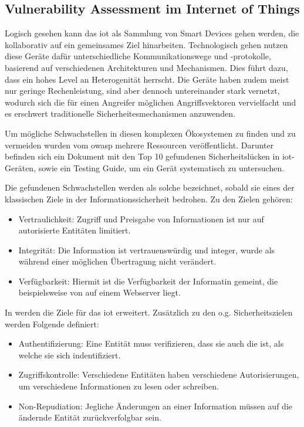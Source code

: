 \subsection{Vulnerability Assessment im Internet of Things}
\label{sec:sota_sa}
    Logisch gesehen kann das \gls{iot} als Sammlung von Smart Devices gehen werden, die kollaborativ auf ein gemeinsames Ziel hinarbeiten. 
    Technologisch gehen nutzen diese Geräte dafür unterschiedliche Kommunikationswege und -protokolle, basierend auf verschiedenen Architekturen und Mechanismen. 
    Dies führt dazu, dass ein hohes Level an Heterogenität herrscht. 
    Die Geräte haben zudem meist nur geringe Rechenleistung, sind aber dennoch untereinander stark vernetzt, wodurch sich die für einen Angreifer möglichen Angriffsvektoren vervielfacht und es erschwert traditionelle Sicherheitesmechanismen anzuwenden.\cite{Sicari2015}
    
    Um mögliche Schwachstellen in diesen komplexen Ökosystemen zu finden und zu vermeiden wurden vom \gls{owasp} mehrere Ressourcen veröffentlicht.
    Darunter befinden sich ein Dokument mit den Top 10 gefundenen Sicherheitslücken in \gls{iot}-Geräten\cite{Miessler2015}, sowie ein Testing Guide\cite{Miessler}, um ein Gerät systematisch zu untersuchen.
    
    
    Die gefundenen Schwachstellen werden als solche bezeichnet, sobald sie eines der klassischen Ziele\cite{Perrin2008} in der Informationssicherheit bedrohen. 
    Zu den Zielen gehören:
    \begin{itemize}[noitemsep]
        \item Vertraulichkeit: Zugriff und Preisgabe von Informationen ist nur auf autorisierte Entitäten limitiert.
        \item Integrität: Die Information ist vertrauenswürdig und integer, wurde als während einer möglichen Übertragung nicht verändert.
        \item Verfügbarkeit: Hiermit ist die Verfügbarkeit der Informatin gemeint, die beispielsweise von auf einem Webserver liegt.
    \end{itemize}
    
    \noindent In \cite{Sicari2015} werden die Ziele für das \gls{iot} erweitert. 
    Zusätzlich zu den o.g. Sicherheitszielen werden Folgende definiert:
    \begin{itemize}[noitemsep]
        \item Authentifizierung: Eine Entität muss verifizieren, dass sie auch die ist, als welche sie sich indentifiziert.
        \item Zugriffskontrolle: Verschiedene Entitäten haben verschiedene Autorisierungen, um verschiedene Informationen zu lesen oder schreiben.
        \item Non-Repudiation: Jegliche Änderungen an einer Information müssen auf die ändernde Entität zurückverfolgbar sein.
    \end{itemize}
	
